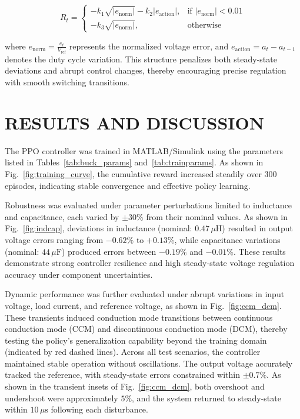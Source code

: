 \documentclass[conference]{IEEEtran}
\begin{document}
\begin{equation}
R_t =
\begin{cases}
-k_1 \sqrt{\left| e_{\text{norm}} \right|} - k_2 \left| e_{\text{action}} \right|, & \text{if } \left| e_{\text{norm}} \right| < 0.01 \\[6pt]
-k_3 \sqrt{\left| e_{\text{norm}} \right|}, & \text{otherwise}
\end{cases}
\label{eq:reward}
\end{equation}

where $e_{\text{norm}} = \frac{e_t}{V_{\text{ref}}}$ represents the normalized voltage error, and $e_{\text{action}} = a_t - a_{t-1}$ denotes the duty cycle variation. This structure penalizes both steady-state deviations and abrupt control changes, thereby encouraging precise regulation with smooth switching transitions.


\section{RESULTS AND DISCUSSION}

The PPO controller was trained in MATLAB/Simulink using the parameters listed in Tables~\ref{tab:buck_params} and~\ref{tab:trainparams}. As shown in Fig.~\ref{fig:training_curve}, the cumulative reward increased steadily over 300 episodes, indicating stable convergence and effective policy learning.

Robustness was evaluated under parameter perturbations limited to inductance and capacitance, each varied by $\pm30\%$ from their nominal values. As shown in Fig.~\ref{fig:indcap}, deviations in inductance (nominal: $0.47\,\mu\text{H}$) resulted in output voltage errors ranging from $-0.62\%$ to $+0.13\%$, while capacitance variations (nominal: $44\,\mu\text{F}$) produced errors between $-0.19\%$ and $-0.01\%$. These results demonstrate strong controller resilience and high steady-state voltage regulation accuracy under component uncertainties.

Dynamic performance was further evaluated under abrupt variations in input voltage, load current, and reference voltage, as shown in Fig.~\ref{fig:ccm_dcm}. These transients induced conduction mode transitions between continuous conduction mode (CCM) and discontinuous conduction mode (DCM), thereby testing the policy’s generalization capability beyond the training domain (indicated by red dashed lines). Across all test scenarios, the controller maintained stable operation without oscillations. The output voltage accurately tracked the reference, with steady-state errors constrained within $\pm0.7\%$. As shown in the transient insets of Fig.~\ref{fig:ccm_dcm}, both overshoot and undershoot were approximately $5\%$, and the system returned to steady-state within $10\,\mu\text{s}$ following each disturbance.
\end{document}
